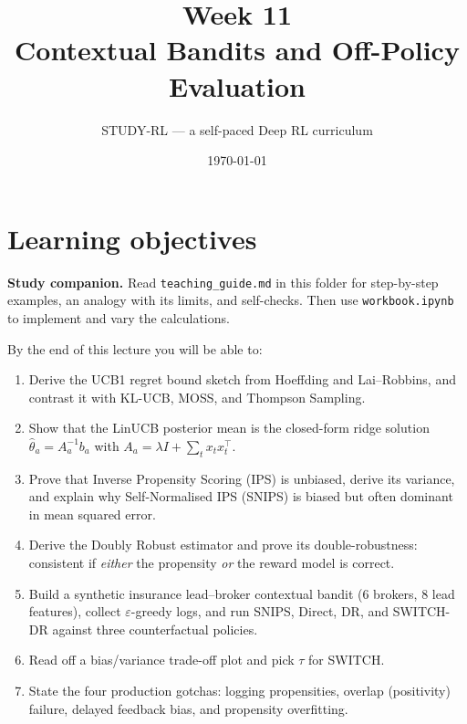 \documentclass[11pt,oneside]{scrbook}
\title{{\color{rlblue}\textbf{Week 11} \\ \Huge Contextual Bandits and Off-Policy Evaluation}}
\author{STUDY-RL --- a self-paced Deep RL curriculum}
\date{\today}
\begin{document}
\maketitle
\tableofcontents
\newpage

\chapter*{Learning objectives}


\noindent\textbf{Study companion.} Read \texttt{teaching\_guide.md} in this
folder for step-by-step examples, an analogy with its limits, and self-checks.
Then use \texttt{workbook.ipynb} to implement and vary the calculations.
\par\medskip

\begin{keyidea}
By the end of this lecture you will be able to:
\begin{enumerate}\setlength\itemsep{2pt}
  \item Derive the UCB1 regret bound sketch from Hoeffding and Lai--Robbins, and
        contrast it with KL-UCB, MOSS, and Thompson Sampling.
  \item Show that the LinUCB posterior mean is the closed-form ridge solution
        $\hat\theta_a = A_a^{-1} b_a$ with $A_a = \lambda I + \sum_t x_t x_t^\top$.
  \item Prove that Inverse Propensity Scoring (IPS) is unbiased, derive its
        variance, and explain why Self-Normalised IPS (SNIPS) is biased but
        often dominant in mean squared error.
  \item Derive the Doubly Robust estimator and prove its double-robustness:
        consistent if \emph{either} the propensity \emph{or} the reward model
        is correct.
  \item Build a synthetic insurance lead--broker contextual bandit (6 brokers,
        8 lead features), collect $\varepsilon$-greedy logs, and run SNIPS,
        Direct, DR, and SWITCH-DR against three counterfactual policies.
  \item Read off a bias/variance trade-off plot and pick $\tau$ for SWITCH.
  \item State the four production gotchas: logging propensities, overlap
        (positivity) failure, delayed feedback bias, and propensity overfitting.
\end{enumerate}
\end{keyidea}
\end{document}
